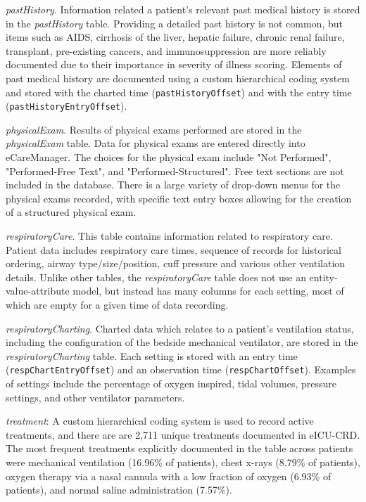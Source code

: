 \documentclass[english]{article}
\newcommand{\colname}[1]{\texttt{#1}}
\newcommand{\tblname}[1]{\emph{#1}}
\begin{document}
\tblname{pastHistory}. Information related a patient's relevant past medical history is stored in the \tblname{pastHistory} table.
Providing a detailed past history is not common, but items such as AIDS, cirrhosis of the liver, hepatic failure, chronic renal failure, transplant, pre-existing cancers, and immunosuppression are more reliably documented due to their importance in severity of illness scoring. Elements of past medical history are documented using a custom hierarchical coding system and stored with the charted time (\colname{pastHistoryOffset}) and with the entry time (\colname{pastHistoryEntryOffset}).

\tblname{physicalExam}. Results of physical exams performed are stored in the \tblname{physicalExam} table. Data for physical exams are entered directly into eCareManager. The choices for the physical exam include "Not Performed", "Performed-Free Text", and "Performed-Structured". Free text sections are not included in the database. There is a large variety of drop-down menus for the physical exams recorded, with specific text entry boxes allowing for the creation of a structured physical exam.

\tblname{respiratoryCare}. This table contains information related to respiratory care. Patient data includes respiratory care times, sequence of records for historical ordering, airway type/size/position, cuff pressure and various other ventilation details. Unlike other tables, the \tblname{respiratoryCare} table does not use an entity-value-attribute model, but instead has many columns for each setting, most of which are empty for a given time of data recording.

\tblname{respiratoryCharting}. Charted data which relates to a patient's ventilation status, including the configuration of the bedside mechanical ventilator, are stored in the \tblname{respiratoryCharting} table.
Each setting is stored with an entry time (\colname{respChartEntryOffset}) and an observation time (\colname{respChartOffset}).
Examples of settings include the percentage of oxygen inspired, tidal volumes, pressure settings, and other ventilator parameters.

\tblname{treatment}: A custom hierarchical coding system is used to record
active treatments, and there are are 2,711 unique treatments documented
in eICU-CRD. The most frequent treatments explicitly documented in the table
across patients were mechanical ventilation (16.96\% of patients), chest
x-rays (8.79\% of patients), oxygen therapy via a nasal cannula with a
low fraction of oxygen (6.93\% of patients), and normal saline
administration (7.57\%).
\end{document}
